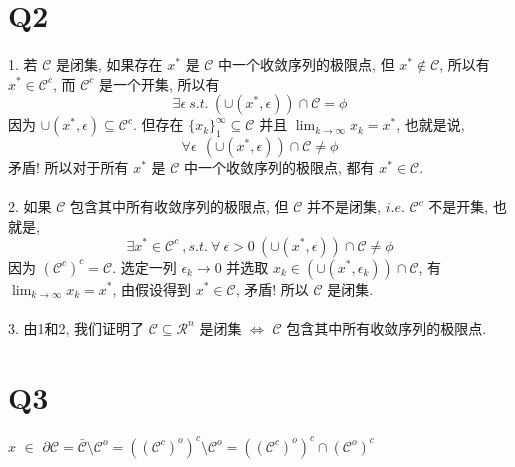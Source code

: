\documentclass{article}
\begin{document}
\begin{CJK}{UTF8}{gbsn}
\section{Q2}
  \paragraph{}
    1. 若 $\mathcal{C}$ 是闭集, 如果存在 $x^*$ 是 $\mathcal{C}$ 中一个收敛序列的极限点, 但 $x^* \not\in \mathcal{C}$, 所以有 $x^* \in \mathcal{C}^c$, 而 $\mathcal{C}^c$ 是一个开集, 所以有
    \begin{equation}
      \exists \epsilon\ s.t.\ (\cup(x^*, \epsilon)) \cap \mathcal{C} = \phi
    \end{equation}
    因为 $\cup(x^*, \epsilon) \subseteq \mathcal{C}^c$. 但存在 $\{x_k\}_1^{\infty} \subseteq \mathcal{C}$ 并且 $\lim_{k \to \infty} x_k = x^*$, 也就是说,
    \begin{equation}
      \forall \epsilon\ \ (\cup(x^*, \epsilon)) \cap \mathcal{C} \not= \phi
    \end{equation}
    矛盾! 所以对于所有 $x^*$ 是 $\mathcal{C}$ 中一个收敛序列的极限点, 都有 $x^* \in \mathcal{C}$.
    \paragraph{}
      2. 如果 $\mathcal{C}$ 包含其中所有收敛序列的极限点, 但 $\mathcal{C}$ 并不是闭集, $i.e.$ $\mathcal{C}^c$ 不是开集, 也就是,
      \begin{equation}
        \exists x^* \in \mathcal{C}^c\ ,s.t.\ \forall\ \epsilon > 0\ (\cup(x^*, \epsilon)) \cap \mathcal{C} \not= \phi
      \end{equation}
      因为 $(\mathcal{C}^c)^c = \mathcal{C}$. 选定一列 $\epsilon_k \to 0$ 并选取 $x_k \in (\cup(x^*, \epsilon_k)) \cap \mathcal{C}$, 有 $\lim_{k \to \infty} x_k = x^*$, 由假设得到 $x^* \in \mathcal{C}$, 矛盾! 所以 $\mathcal{C}$ 是闭集.
    \paragraph{}
      3. 由1和2, 我们证明了 $\mathcal{C} \subseteq \mathcal{R}^n$ 是闭集 $\iff$ $\mathcal{C}$ 包含其中所有收敛序列的极限点.

\section{Q3}
  \paragraph{}
  $x$ $\in$ $\partial\mathcal{C} = \bar{\mathcal{C}} \setminus \mathcal{C}^o = ((\mathcal{C}^c)^o)^c \setminus \mathcal{C}^o = ((\mathcal{C}^c)^o)^c \cap (\mathcal{C}^o)^c$

\end{CJK}
\end{document}
